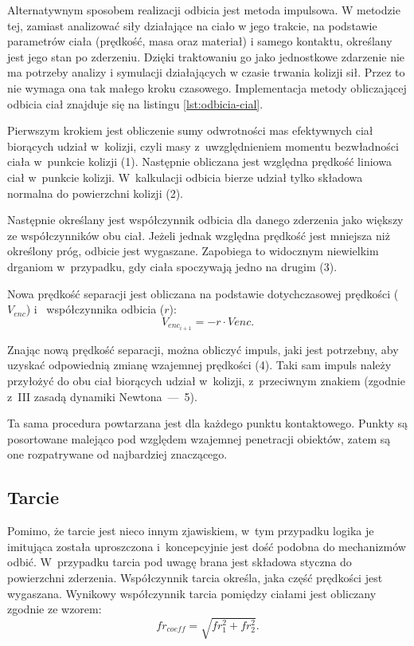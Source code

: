 Alternatywnym sposobem realizacji odbicia jest metoda impulsowa. W metodzie tej, zamiast analizować siły działające na ciało w jego trakcie, na podstawie parametrów ciała (prędkość, masa oraz materiał) i samego kontaktu, określany jest jego stan po zderzeniu. Dzięki traktowaniu go jako jednostkowe zdarzenie nie ma potrzeby analizy i symulacji działających w czasie trwania kolizji sił. Przez to nie wymaga ona tak małego kroku czasowego. Implementacja metody obliczającej odbicia ciał znajduje się na listingu \ref{lst:odbicia-cial}.
\clearpage


Pierwszym krokiem jest obliczenie sumy odwrotności mas efektywnych ciał biorących udział w~kolizji, czyli masy z~uwzględnieniem momentu bezwładności ciała w~punkcie kolizji (1). Następnie obliczana jest względna prędkość liniowa ciał w~punkcie kolizji. W~kalkulacji odbicia bierze udział tylko składowa normalna do powierzchni kolizji (2).

Następnie określany jest współczynnik odbicia dla danego zderzenia jako większy ze współczynników obu ciał. Jeżeli jednak względna prędkość jest mniejsza niż określony próg, odbicie jest wygaszane. Zapobiega to widocznym niewielkim drganiom w~przypadku, gdy ciała spoczywają jedno na drugim (3).

Nowa prędkość separacji jest obliczana na podstawie dotychczasowej prędkości ($V_{enc}$) i~ współczynnika odbicia ($r$):
\begin{equation}
V_{enc_{i+1}} = -r \cdot V{enc}.
\end{equation}

Znając nową prędkość separacji, można obliczyć impuls, jaki jest potrzebny, aby uzyskać odpowiednią zmianę wzajemnej prędkości (4). Taki sam impuls należy przyłożyć do obu ciał biorących udział w~kolizji, z~przeciwnym znakiem (zgodnie z~III zasadą dynamiki Newtona~---~5).

Ta sama procedura powtarzana jest dla każdego punktu kontaktowego. Punkty są posortowane malejąco pod względem wzajemnej penetracji obiektów, zatem są one rozpatrywane od najbardziej znaczącego.

\subsection{Tarcie}
Pomimo, że tarcie jest nieco innym zjawiskiem, w~tym przypadku logika je imitująca została uproszczona i~koncepcyjnie jest dość podobna do mechanizmów odbić. W~przypadku tarcia pod uwagę brana jest składowa styczna do powierzchni zderzenia. Współczynnik tarcia określa, jaka część prędkości jest wygaszana. Wynikowy współczynnik tarcia pomiędzy ciałami jest obliczany zgodnie ze wzorem:
	\begin{equation}
	fr_{coeff} = \sqrt{fr_1^2 + fr_2^2}.
	\end{equation}
	
